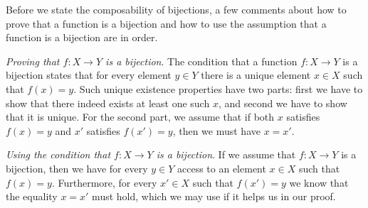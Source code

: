 Before we state the composability of bijections,
a few comments about how to prove that a function is a bijection and how to use the assumption that a function is a bijection are in order.

\emph{Proving that $f:X\to Y$ is a bijection}.
The condition that a function $f:X\to Y$ is a bijection states that for every element $y\in Y$ there is a unique element $x\in X$ such that $f(x)=y$.
Such unique existence properties have two parts:
first we have to show that there indeed exists at least one such $x$,
and second we have to show that it is unique.
For the second part,
we assume that if both $x$ satisfies $f(x)=y$ and $x'$ satisfies $f(x')=y$,
then we must have $x=x'$.

\emph{Using the condition that $f:X\to Y$ is a bijection}.
If we assume that $f:X\to Y$ is a bijection,
then we have for every $y\in Y$ access to an element $x\in X$ such that $f(x)=y$.
Furthermore,
for every $x'\in X$ such that $f(x')=y$ we know that the equality $x=x'$ must hold,
which we may use if it helps us in our proof.

